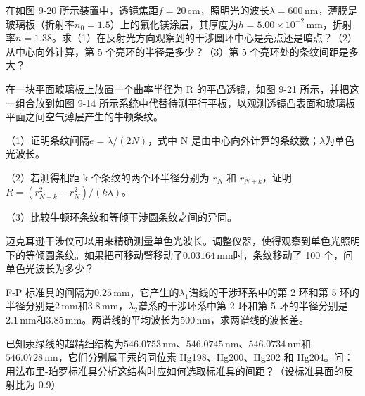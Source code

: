 \documentclass[padl, analysis, notocnum]{ExBook}
\newcommand{\answerarea}[1][3.5cm]{%
  \par\vspace{1mm}%
  \noindent{\color{themeColor!35}\rule{\linewidth}{0.4pt}}\par
  \noindent\begin{minipage}[t][#1][t]{\linewidth}\vspace{0pt}\end{minipage}\par
  \noindent{\color{themeColor!35}\rule{\linewidth}{0.4pt}}\par
}
\begin{document}
\begin{qitems}[startnum=6]
\qitem 在如图 9-20 所示装置中，透镜焦距$f=20\,\mathrm{cm}$，照明光的波长$\lambda =600\,\mathrm{nm}$，薄膜是玻璃板（折射率$n_{0}=1.5$）上的氟化镁涂层，其厚度为$h=5.00\times 10^{-2}\,\mathrm{mm}$，折射率$n=1.38$。求（1）在反射光方向观察到的干涉圆环中心是亮点还是暗点？（2）从中心向外计算，第 5 个亮环的半径是多少？（3）第 5 个亮环处的条纹间距是多大？
\label{q:253:start}
\answerarea[2.4cm]
\label{q:253:end}
\end{qitems}

\begin{qitems}[startnum=7]
\qitem 在一块平面玻璃板上放置一个曲率半径为 R 的平凸透镜，如图 9-21 所示，并把这一组合放到如图 9-14 所示系统中代替待测平行平板，以观测透镜凸表面和玻璃板平面之间空气薄层产生的牛顿条纹。
\par\noindent （1）证明条纹间隔$e=\lambda /(2N)$，式中 N 是由中心向外计算的条纹数；$\lambda$为单色光波长。
\par\noindent （2）若测得相距 k 个条纹的两个环半径分别为 $r_{N}$ 和 $r_{N+k}$，证明$R=(r_{N+k}^{2}-r_{N}^{2})/(k\lambda)$。
\par\noindent （3）比较牛顿环条纹和等倾干涉圆条纹之间的异同。
\label{q:254:start}
\answerarea[2.0cm]
\label{q:254:end}
\end{qitems}

\begin{qitems}[startnum=8]
\qitem 迈克耳逊干涉仪可以用来精确测量单色光波长。调整仪器，使得观察到单色光照明下的等倾圆条纹。如果把可移动臂移动了$0.03164\,\mathrm{mm}$时，条纹移动了 100 个，问单色光波长为多少？
\label{q:255:start}
\answerarea[7.0cm]
\label{q:255:end}
\end{qitems}

\begin{qitems}[startnum=9]
\qitem F-P 标准具的间隔为$0.25\,\mathrm{mm}$，它产生的$\lambda_{1}$谱线的干涉环系中的第 2 环和第 5 环的半径分别是$2\,\mathrm{mm}$和$3.8\,\mathrm{mm}$，$\lambda_{2}$谱系的干涉环系中第 2 环和第 5 环的半径分别是$2.1\,\mathrm{mm}$和$3.85\,\mathrm{mm}$。两谱线的平均波长为$500\,\mathrm{nm}$，求两谱线的波长差。
\label{q:256:start}
\answerarea[7.0cm]
\label{q:256:end}
\end{qitems}

\begin{qitems}[startnum=10]
\qitem 已知汞绿线的超精细结构为$546.0753\,\mathrm{nm}$、$546.0745\,\mathrm{nm}$、$546.0734\,\mathrm{nm}$和$546.0728\,\mathrm{nm}$，它们分别属于汞的同位素 Hg198、Hg200、Hg202 和 Hg204。问：用法布里-珀罗标准具分析这结构时应如何选取标准具的间距？（设标准具面的反射比为 0.9）
\label{q:257:start}
\answerarea[7.0cm]
\label{q:257:end}
\end{qitems}
\end{document}
